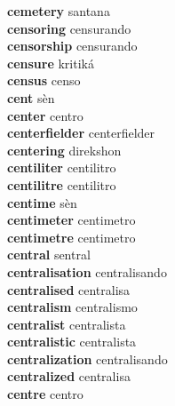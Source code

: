 \textbf{cemetery } santana \\
\textbf{censoring } censurando \\
\textbf{censorship } censurando \\
\textbf{censure } kritiká \\
\textbf{census } censo \\
\textbf{cent } sèn \\
\textbf{center } centro \\
\textbf{centerfielder } centerfielder \\
\textbf{centering } direkshon \\
\textbf{centiliter } centilitro \\
\textbf{centilitre } centilitro \\
\textbf{centime } sèn \\
\textbf{centimeter } centimetro \\
\textbf{centimetre } centimetro \\
\textbf{central } sentral \\
\textbf{centralisation } centralisando \\
\textbf{centralised } centralisa \\
\textbf{centralism } centralismo \\
\textbf{centralist } centralista \\
\textbf{centralistic } centralista \\
\textbf{centralization } centralisando \\
\textbf{centralized } centralisa \\
\textbf{centre } centro \\
